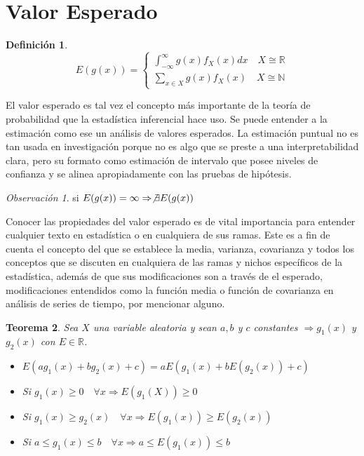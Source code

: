 \documentclass[11pt,a4paper,oneside]{report}
\theoremstyle{definition}
\newtheorem{definicion}{Definición}[chapter]
\theoremstyle{plain}
\newtheorem{teorema}[definicion]{Teorema}
\theoremstyle{remark}
\newtheorem*{observacion}{Observación}
\newcommand{\N}{\mathbb{N}}
\newcommand{\R}{\mathbb{R}}
\begin{document}
\section{Valor Esperado}

\begin{definicion}
  \[E(g(x))=\left\{
  \begin{array}{l}
    \int_{- \infty}^{\infty}g(x)f_{X}(x)dx \quad X \cong \R\\
    \sum_{x\in X}g(x)f_{X}(x) \quad X \cong \N
  \end{array}
\right.\]
\end{definicion}

El valor esperado es tal vez el concepto más importante de la teoría de probabilidad que 
la estadística inferencial hace uso. Se puede entender a la estimación como ese un análisis de valores 
esperados. La estimación puntual no es tan usada en investigación porque no es algo que se preste a una 
interpretabilidad clara, pero su formato como estimación de intervalo que posee niveles de confianza y se 
alinea apropiadamente con las pruebas de hipótesis. 

\begin{observacion}
  si $E(g(x)) = \infty \Rightarrow \not \exists E(g(x))$ 
\end{observacion}

Conocer las propiedades del valor esperado es de vital importancia para entender cualquier texto en estadística 
o en cualquiera de sus ramas. Este es a fin de cuenta el concepto del que se establece la media, varianza, covarianza y 
todos los conceptos que se discuten en cualquiera de las ramas y nichos específicos de la estadística, además de que sus
modificaciones son a través de el esperado, modificaciones entendidos como la función media o función de covarianza en 
análisis de series de tiempo, por mencionar alguno. 

\begin{teorema}
  Sea $X$ una variable aleatoria y sean $a,b$ y $c$ constantes $\Rightarrow g_1(x)$ y $g_2(x)$ con 
  $E\in \R$.
  \begin{itemize}
    \item $E(ag_1(x)+bg_2(x)+c)=aE(g_1(x)+bE(g_2(x))+c)$
    \item Si $g_1(x)\geq 0 \quad \forall x \Rightarrow E(g_1(X))\geq 0$
    \item Si $g_1(x)\geq g_2(x) \quad \forall x \Rightarrow E(g_1(x))\geq E(g_2(x))$
    \item Si $a \leq g_1(x)\leq b \quad \forall x \Rightarrow a \leq E(g_1(x))\leq b$
  \end{itemize}
\end{teorema}
\end{document}
